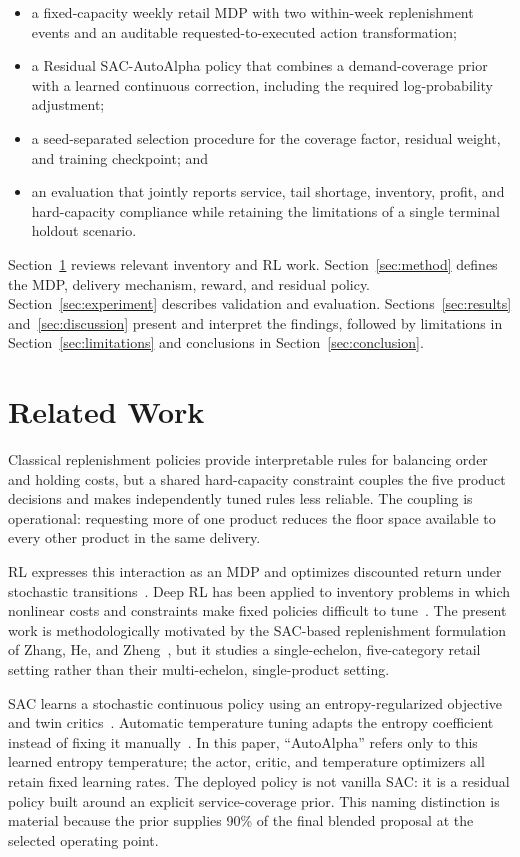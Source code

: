 \documentclass[pdflatex,sn-mathphys-num]{sn-jnl}
\begin{document}
\begin{itemize}
    \item a fixed-capacity weekly retail MDP with two within-week replenishment events and an auditable requested-to-executed action transformation;
    \item a Residual SAC-AutoAlpha policy that combines a demand-coverage prior with a learned continuous correction, including the required log-probability adjustment;
    \item a seed-separated selection procedure for the coverage factor, residual weight, and training checkpoint; and
    \item an evaluation that jointly reports service, tail shortage, inventory, profit, and hard-capacity compliance while retaining the limitations of a single terminal holdout scenario.
\end{itemize}

Section~\ref{sec:related} reviews relevant inventory and RL work. Section~\ref{sec:method} defines the MDP, delivery mechanism, reward, and residual policy. Section~\ref{sec:experiment} describes validation and evaluation. Sections~\ref{sec:results} and~\ref{sec:discussion} present and interpret the findings, followed by limitations in Section~\ref{sec:limitations} and conclusions in Section~\ref{sec:conclusion}.

\section{Related Work}\label{sec:related}

Classical replenishment policies provide interpretable rules for balancing order and holding costs, but a shared hard-capacity constraint couples the five product decisions and makes independently tuned rules less reliable. The coupling is operational: requesting more of one product reduces the floor space available to every other product in the same delivery.

RL expresses this interaction as an MDP and optimizes discounted return under stochastic transitions~\cite{bib22}. Deep RL has been applied to inventory problems in which nonlinear costs and constraints make fixed policies difficult to tune~\cite{bib5}. The present work is methodologically motivated by the SAC-based replenishment formulation of Zhang, He, and Zheng~\cite{bib1}, but it studies a single-echelon, five-category retail setting rather than their multi-echelon, single-product setting.

SAC learns a stochastic continuous policy using an entropy-regularized objective and twin critics~\cite{bib3}. Automatic temperature tuning adapts the entropy coefficient instead of fixing it manually~\cite{bib23}. In this paper, ``AutoAlpha'' refers only to this learned entropy temperature; the actor, critic, and temperature optimizers all retain fixed learning rates. The deployed policy is not vanilla SAC: it is a residual policy built around an explicit service-coverage prior. This naming distinction is material because the prior supplies 90\% of the final blended proposal at the selected operating point.
\end{document}
